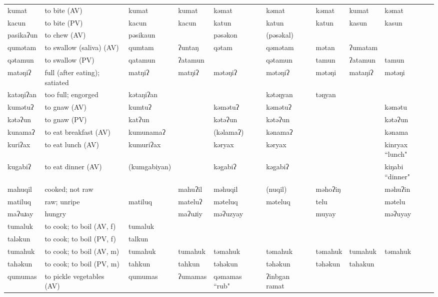 \begin{landscape}
\begin{longtable}{*{9}{>{\raggedright\arraybackslash}p{}}}
\text{*}kumat & to bite (AV) & kumat & kumat & kəmat & kəmat & kəmat & kumat & kəmat\\
\text{*}kacun & to bite (PV) & kacun & kacun & katun & katun & katun & kasun & kasun\\
\text{*}pasikaʔun & to chew (AV) & pəsikaun &  & pəsəkon & (pəsəkal) &  &  & \\
\text{*}qumətam & to swallow (saliva) (AV) & qumtam & ʔuntaŋ & qətam & qəmətam & mətan & ʔumatam & \\
\text{*}qətamun & to swallow (PV) & qatamun & ʔatamun &  & qətamun & tamun & ʔatamun & tamun\\
\text{*}matəŋiʔ & full (after eating); satiated & matŋiʔ & matŋiʔ & mətəŋiʔ & mətəŋiʔ & mətəŋi & mataŋiʔ & mətəŋi\\
\text{*}katəŋiʔan & too full; engorged & kətaŋiʔan &  &  & kətəŋyan & təŋyan &  & \\
\text{*}kumətuʔ & to gnaw (AV) & kumtuʔ &  & kəmətuʔ & kəmətuʔ &  &  & kəmətu\\
\text{*}kətəʔun & to gnaw (PV) & katʔun &  & kətəʔun & kətəʔun &  &  & kətəʔun\\
\text{*}kunamaʔ & to eat breakfast (AV) & kumunamaʔ &  & (kəlamaʔ) & kənamaʔ &  &  & kənama\\
\text{*}kuriʔax & to eat lunch (AV) & kumuriʔax &  & kəryax & kəryax &  &  & kinryax ``lunch"\\
\text{*}kugabiʔ & to eat dinner (AV) & (kumgabiyan) &  & kəgabiʔ & kəgabiʔ &  &  & kiŋabi ``dinner"\\
\text{*}mahuqil & cooked; not raw &  & mahuʔil & məhuqil & (nuqil) & məhoʔiŋ &  & məhuʔin\\
\text{*}matiluq & raw; unripe & matiluq & mateluʔ & məteluq & məteluq & telu &  & mətelu\\
\text{*}maʔuɹay & hungry &  & maʔuɹiy & məʔuzyay &  & muyay &  & məʔuyay\\
\text{*}tumaluk & to cook; to boil (AV, f) & tumaluk &  &  &  &  &  & \\
\text{*}taləkun & to cook; to boil (PV, f) & talkun &  &  &  &  &  & \\
\text{*}tumahuk & to cook; to boil (AV, m) & tumahuk & tumahuk & təmahuk & təmahuk & təmahuk & tumahuk & təmahuk\\
\text{*}tahəkun & to cook; to boil (PV, m) & tahkun & tahkun & təhəkun & təhəkun & təhəkun & tahakun & \\
\text{*}qumumas & to pickle vegetables (AV) & qumumas & ʔumamas & qəmamas ``rub" & ʔinbgan ramat &  &  & \\

\end{longtable}
\end{landscape}
